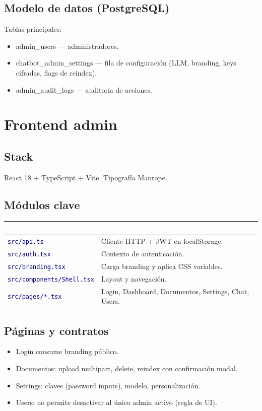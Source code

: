 \documentclass[11pt, a4paper, oneside]{report}
\newcommand{\ruta}[1]{\texttt{\textcolor{navy}{#1}}}
\begin{document}
\section{Modelo de datos (PostgreSQL)}
Tablas principales:

\begin{itemize}
  \item {admin\_users} — administradores.
  \item {chatbot\_admin\_settings} — fila de configuración (LLM, branding, keys cifradas, flags de reindex).
  \item {admin\_audit\_logs} — auditoría de acciones.
\end{itemize}
\chapter{Frontend admin}

\section{Stack}
React 18 + TypeScript + Vite. Tipografía Manrope. 

\section{Módulos clave}
\begin{tabularx}{\linewidth}{L{5cm} Y}
  \toprule
  \textcolor{white}{\textbf{Archivo}} &
  \textcolor{white}{\textbf{Rol}} \\
  \midrule
  \ruta{src/api.ts} & Cliente HTTP + JWT en {localStorage}. \\
  \ruta{src/auth.tsx} & Contexto de autenticación. \\
  \ruta{src/branding.tsx} & Carga branding y aplica CSS variables. \\
  \ruta{src/components/Shell.tsx} & Layout y navegación. \\
  \ruta{src/pages/*.tsx} & Login, Dashboard, Documentos, Settings, Chat, Users. \\
  \bottomrule
\end{tabularx}

\section{Páginas y contratos}
\begin{itemize}
  \item Login consume branding público.
  \item Documentos: upload multipart, delete, reindex con confirmación modal.
  \item Settings: claves (password inputs), modelo, personalización.
  \item Users: no permite desactivar al único admin activo (regla de UI).
\end{itemize}
\end{document}
